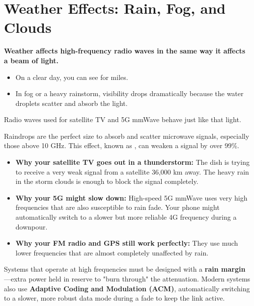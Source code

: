 
\chapter{Weather Effects: Rain, Fog, and Clouds}
\label{ch:weather-effects}

\begin{nontechnical}
    \textbf{Weather affects high-frequency radio waves in the same way it affects a beam of light.}

    \begin{itemize}
        \item On a clear day, you can see for miles.
        \item In fog or a heavy rainstorm, visibility drops dramatically because the water droplets scatter and absorb the light.
    \end{itemize}
    Radio waves used for satellite TV and 5G mmWave behave just like that light.

    Raindrops are the perfect size to absorb and scatter microwave signals, especially those above 10 GHz. This effect, known as , can weaken a signal by over 99\%.
    \begin{itemize}
        \item \textbf{Why your satellite TV goes out in a thunderstorm:} The dish is trying to receive a very weak signal from a satellite 36,000 km away. The heavy rain in the storm clouds is enough to block the signal completely.
        \item \textbf{Why your 5G might slow down:} High-speed 5G mmWave uses very high frequencies that are also susceptible to rain fade. Your phone might automatically switch to a slower but more reliable 4G frequency during a downpour.
        \item \textbf{Why your FM radio and GPS still work perfectly:} They use much lower frequencies that are almost completely unaffected by rain.
    \end{itemize}

     Systems that operate at high frequencies must be designed with a \textbf{rain margin}---extra power held in reserve to "burn through" the attenuation. Modern systems also use \textbf{Adaptive Coding and Modulation (ACM)}, automatically switching to a slower, more robust data mode during a fade to keep the link active.
\end{nontechnical}


